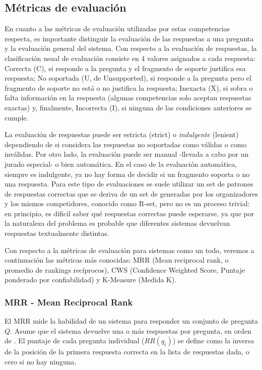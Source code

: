 \subsection{Métricas de evaluación}
\label{subsec:metricas}

En cuanto a las métricas de evaluación utilizadas por estas competencias respecta, es importante distinguir la evaluación de las respuestas a una pregunta y la evaluación general del sistema. Con respecto a la evaluación de respuestas, la clasificación usual de evaluación consiste en 4 valores asignados a cada respuesta: Correcta (C), si responde a la pregunta y el fragmento de soporte justifica esa respuesta; No soportada (U, de Unsupported), si responde a la pregunta pero el fragmento de soporte no está o no justifica la respuesta; Inexacta (X), si sobra o falta información en la respuesta (algunas competencias solo aceptan respuestas exactas) y, finalmente, Incorrecta (I), si ninguna de las condiciones anteriores se cumple. 

La evaluación de respuestas puede ser estricta (strict) o \textit{indulgente} (lenient) dependiendo de si considera las respuestas no soportadas como válidas o como inválidas. Por otro lado, la evaluación puede ser manual -llevada a cabo por un jurado especial- o bien automática. En el caso de la evaluación automática, siempre es indulgente, ya no hay forma de decidir si un fragmento soporta o no una respuesta. Para este tipo de evaluaciones se suele utilizar un set de patrones de respuestas correctas que se deriva de un set de  generadas por los organizadores y los mismos competidores, conocido como R-set, pero no es un proceso trivial: en principio, es dificil saber qué respuestas correctas puede esperarse, ya que por la naturaleza del problema es probable que diferentes sistemas devuelvan respuestas textualmente distintas. 

Con respecto a la métricas de evaluación para sistemas como un todo, veremos a continuación las métricas más conocidas: MRR (Mean reciprocal rank, o promedio de rankings recíprocos), CWS (Confidence Weighted Score, Puntaje ponderado por confiabilidad) y K-Measure (Medida K).

\subsubsection*{MRR - Mean Reciprocal Rank}
El MRR mide la habilidad de un sistema para responder un conjunto de pregunta $Q$. Asume que el sistema devuelve una o más respuestas por pregunta, en orden de . El puntaje de cada pregunta individual ($RR(q_i)$) se define como la inversa de la posición de la primera respuesta correcta en la lista de respuestas dada, o cero si no hay ninguna.

